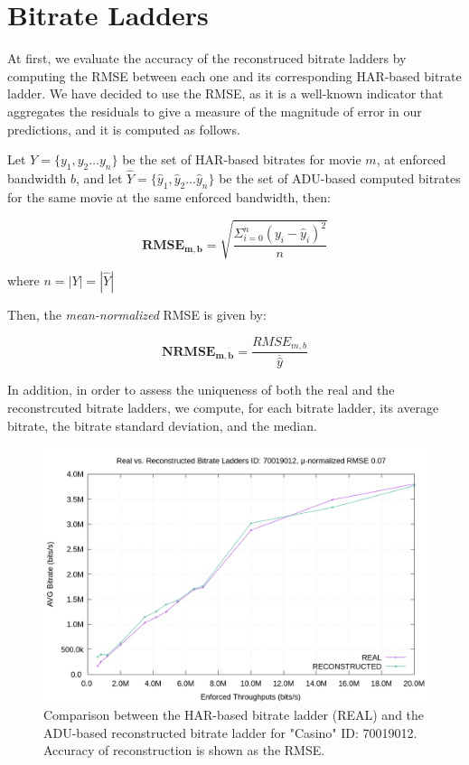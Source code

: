 \section{Bitrate Ladders}

At first, we evaluate the accuracy of the reconstruced bitrate ladders by
computing the RMSE between each one and its corresponding HAR-based bitrate
ladder. We have decided to use the RMSE, as it is a well-known indicator that
aggregates the residuals to give a measure of the magnitude of error in our
predictions, and it is computed as follows.

Let $Y=\{y_1, y_2 \dots y_n\}$ be the set of HAR-based bitrates for movie $m$,
at enforced bandwidth $b$, and let $\hat{Y}=\{\hat{y}_1, \hat{y}_2 \dots
\hat{y}_n\}$ be the set of ADU-based computed bitrates for the same movie at
the same enforced bandwidth, then:

\begin{equation*}
    \mathbf{RMSE_{m, b}} = \sqrt{\dfrac{\Sigma_{i=0}^{n}(y_i - \hat{y}_i)^2}{n}}
\end{equation*}

where $n = |Y| = |\hat{Y}|$

Then, the \emph{mean-normalized} RMSE is given by:

\begin{equation*}
    \mathbf{NRMSE_{m, b}} = \dfrac{RMSE_{m, b}}{\overline{\hat{y}}}
\end{equation*}

In addition, in order to assess the uniqueness of both the real and the
reconstrcuted bitrate ladders, we compute, for each bitrate ladder, its average
bitrate, the bitrate standard deviation, and the median. 

\begin{figure}[!h]
  \centering
  \includegraphics[width=\columnwidth]{img/70019012.png}
  \caption{Comparison between the HAR-based bitrate ladder (REAL) and the
  ADU-based reconstructed bitrate ladder for "Casino" ID: 70019012. Accuracy of
  reconstruction is shown as the RMSE.}
  \label{fig:bl_comparison_good}
\end{figure}


